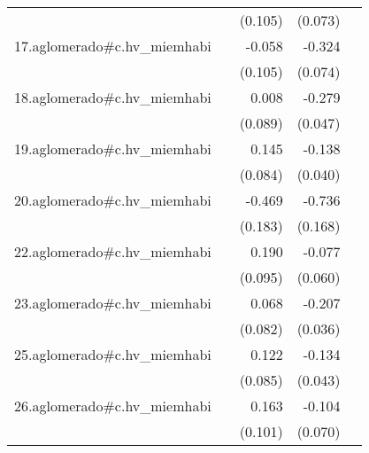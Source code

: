 {\begin{longtable}{l*{4}{D{.}{.}{-1}}}
            &                     &     (0.105)         &     (0.073)         &                     \\
\addlinespace
17.aglomerado#c.hv\_miemhabi&                     &      -0.058         &      -0.324\sym{***}&                     \\
            &                     &     (0.105)         &     (0.074)         &                     \\
\addlinespace
18.aglomerado#c.hv\_miemhabi&                     &       0.008         &      -0.279\sym{***}&                     \\
            &                     &     (0.089)         &     (0.047)         &                     \\
\addlinespace
19.aglomerado#c.hv\_miemhabi&                     &       0.145         &      -0.138\sym{***}&                     \\
            &                     &     (0.084)         &     (0.040)         &                     \\
\addlinespace
20.aglomerado#c.hv\_miemhabi&                     &      -0.469\sym{*}  &      -0.736\sym{***}&                     \\
            &                     &     (0.183)         &     (0.168)         &                     \\
\addlinespace
22.aglomerado#c.hv\_miemhabi&                     &       0.190\sym{*}  &      -0.077         &                     \\
            &                     &     (0.095)         &     (0.060)         &                     \\
\addlinespace
23.aglomerado#c.hv\_miemhabi&                     &       0.068         &      -0.207\sym{***}&                     \\
            &                     &     (0.082)         &     (0.036)         &                     \\
\addlinespace
25.aglomerado#c.hv\_miemhabi&                     &       0.122         &      -0.134\sym{**} &                     \\
            &                     &     (0.085)         &     (0.043)         &                     \\
\addlinespace
26.aglomerado#c.hv\_miemhabi&                     &       0.163         &      -0.104         &                     \\
            &                     &     (0.101)         &     (0.070)         &                     \\

\end{longtable}}

